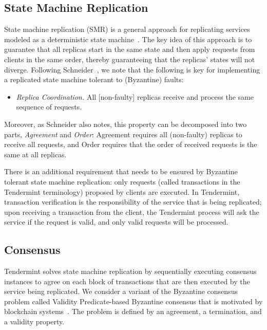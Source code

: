 \subsection{State Machine Replication}

State machine replication (SMR) is a general approach for replicating services
modeled as a deterministic state machine~\cite{Lam78:cacm,Sch90:survey}.  The
key idea of this approach is to guarantee that all replicas start in the same
state and then apply requests from clients in the same order, thereby
guaranteeing that the replicas' states will not diverge.  Following
Schneider~\cite{Sch90:survey}, we note that the following is key for
implementing a replicated state machine tolerant to (Byzantine) faults:

\begin{itemize} \item \emph{Replica Coordination.} All [non-faulty] replicas
    receive and process the same sequence of requests.  \end{itemize}

Moreover, as Schneider also notes, this property can be decomposed into two
parts, \emph{Agreement} and \emph{Order}: Agreement requires all (non-faulty)
replicas to receive all requests, and Order requires that the order of received
requests is the same at all replicas.

There is an additional requirement that needs to be ensured by Byzantine
tolerant state machine replication: only requests (called transactions in the
Tendermint terminology) proposed by clients are executed. In Tendermint,
transaction verification is the responsibility of the service that is being
replicated; upon receiving a transaction from the client, the Tendermint
process will ask the service if the request is valid, and only valid requests
will be processed. 

 \subsection{Consensus} \label{sec:consensus}

Tendermint solves state machine replication by sequentially executing consensus
instances to agree on each block of transactions that are
then executed by the service being replicated. We consider a variant of the
Byzantine consensus problem called Validity Predicate-based Byzantine consensus
that is motivated by blockchain systems~\cite{GLR17:red-belly-bc}. The problem
is defined by an agreement, a termination, and a validity property.

